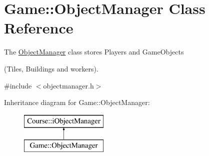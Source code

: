 \hypertarget{classGame_1_1ObjectManager}{\section{Game\-:\-:Object\-Manager Class Reference}
\label{classGame_1_1ObjectManager}
}


The \hyperlink{classGame_1_1ObjectManager}{Object\-Manager} class stores Players and Game\-Objects \par
(Tiles, Buildings and workers).  




{\ttfamily \#include $<$objectmanager.\-h$>$}

Inheritance diagram for Game\-:\-:Object\-Manager\-:\begin{figure}[H]
\begin{center}
\leavevmode
\includegraphics[height=2.000000cm]{classGame_1_1ObjectManager}
\end{center}
\end{figure}
